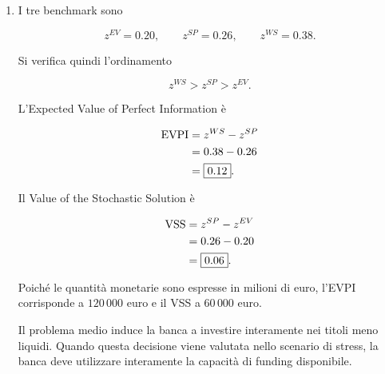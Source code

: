 \begin{enumerate}
\[
\boxed{
u_2^*=3,
\qquad
g_2^*=0.
}
\]

Il valore del ricorso nello scenario $2$ \`e quindi

\[
Q_2(x^{EV})
=
-0.20(3)
=
-0.60.
\]

Il valore stocastico della decisione
$x^{EV}$ \`e infine

\[
\begin{aligned}
z^{EV}
&=
c'x^{EV}
+
\frac12 Q_1(x^{EV})
+
\frac12 Q_2(x^{EV})
\\
&=
0.50
+
\frac12(0)
+
\frac12(-0.60)
\\
&=
\boxed{0.20}.
\end{aligned}
\]

La distinzione \`e quindi

\[
\Pi^{EV}(10)=0.39
\]

per il valore ottimo del problema deterministico medio,
mentre

\[
z^{EV}=0.20
\]

\`e il valore della decisione iniziale $x^{EV}$
quando essa viene valutata
negli scenari originari.

\item I tre benchmark sono

\[
\boxed{
z^{EV}=0.20,
\qquad
z^{SP}=0.26,
\qquad
z^{WS}=0.38.
}
\]

Si verifica quindi l'ordinamento

\[
z^{WS}>z^{SP}>z^{EV}.
\]

L'Expected Value of Perfect Information \`e

\[
\begin{aligned}
\operatorname{EVPI}
&=
z^{WS}-z^{SP}
\\
&=
0.38-0.26
\\
&=
\boxed{0.12}.
\end{aligned}
\]

Il Value of the Stochastic Solution \`e

\[
\begin{aligned}
\operatorname{VSS}
&=
z^{SP}-z^{EV}
\\
&=
0.26-0.20
\\
&=
\boxed{0.06}.
\end{aligned}
\]

Poich\'e le quantit\`a monetarie
sono espresse in milioni di euro,
l'EVPI corrisponde a $120\,000$ euro
e il VSS a $60\,000$ euro.

Il problema medio induce la banca
a investire interamente nei titoli
meno liquidi. Quando questa decisione
viene valutata nello scenario di stress,
la banca deve utilizzare interamente
la capacit\`a di funding disponibile.


\end{enumerate}
